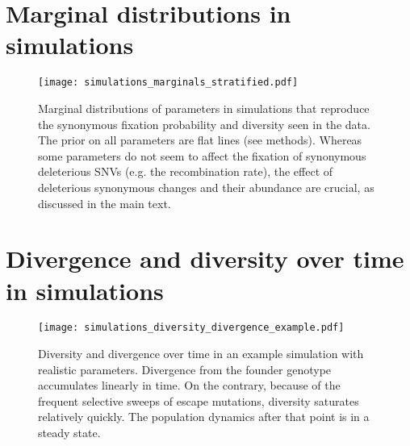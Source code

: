 \newpage
\section{Marginal distributions in simulations}
\begin{figure}[h]
\begin{center}
\texttt{[image: simulations\_marginals\_stratified.pdf]}
\caption{
Marginal distributions of parameters in simulations that reproduce the
synonymous fixation probability and diversity seen in the data. The prior on all
parameters are flat lines (see methods). Whereas some parameters do not seem to
affect the fixation of synonymous deleterious SNVs (e.g. the recombination
rate), the effect of deleterious synonymous changes and their abundance are
crucial, as discussed in the main text.
}
\label{fig:sims_altparameters}
\end{center}
\end{figure}


\newpage
\section{Divergence and diversity over time in simulations}
\begin{figure}[h]
\begin{center}
\texttt{[image: simulations\_diversity\_divergence\_example.pdf]}
\caption{
Diversity and divergence over time in an example simulation with realistic
parameters. Divergence from the founder genotype accumulates linearly  in time. On the
contrary, because of the frequent selective sweeps of escape mutations, diversity saturates
relatively quickly. The population dynamics after that point is in a steady
state.
}
\label{fig:sims_altparameters}
\end{center}
\end{figure}

